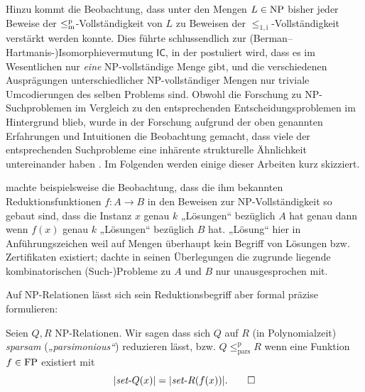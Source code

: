 Hinzu kommt die Beobachtung, dass unter den Mengen $L\in\mathrm{NP}$ bisher jeder Beweise der $\leq_\mathrm{m}^\mathrm{p}$-Vollständigkeit von $L$ zu Beweisen der $\leq_\mathrm{1,i}$-Vollständigkeit verstärkt werden konnte.
Dies führte schlussendlich zur (Berman–Hartmanis-\nolinebreak)\linebreak[1]Isomorphievermutung $\mathsf{IC}$, in der postuliert wird, dass es im Wesentlichen nur \emph{eine} NP-vollständige Menge gibt, und die verschiedenen Ausprägungen unterschiedlicher NP-vollständiger Mengen nur triviale Umcodierungen des selben Problems sind.
Obwohl die Forschung zu NP-Suchproblemen im Vergleich zu den entsprechenden Entscheidungsproblemen im Hintergrund blieb, wurde in der Forschung aufgrund der oben genannten Erfahrungen und Intuitionen die Beobachtung gemacht, dass viele der entsprechenden Suchprobleme eine inhärente strukturelle Ähnlichkeit untereinander haben \parencite[vgl. auch die Diskussion von][]{hemaspaandra_take-home_1998}.
Im Folgenden werden einige dieser Arbeiten kurz skizziert.

\textcite[83]{simon_central_1975} machte beispielsweise die Beobachtung, dass die ihm bekannten Reduktionsfunktionen $f\colon A\to B$ in den Beweisen zur NP-Vollständigkeit so gebaut sind, dass die Instanz $x$ genau $k$ „Lösungen“ bezüglich $A$ hat genau dann wenn $f(x)$ genau $k$ „Lösungen“ bezüglich $B$ hat. „Lösung“ hier in Anführungszeichen weil auf Mengen überhaupt kein Begriff von Lösungen bzw. Zertifikaten existiert; \citeauthor{simon_central_1975} dachte in seinen Überlegungen die zugrunde liegende kombinatorischen (Such-)Probleme zu $A$ und $B$ nur unausgesprochen mit.

Auf NP-Relationen lässt sich sein Reduktionsbegriff aber formal präzise formulieren:
\begin{definition}
    Seien $Q, R$ NP-Relationen. Wir sagen dass sich $Q$ auf $R$ (in Polynomialzeit) \emph{sparsam} (\emph{„parsimonious“}) reduzieren lässt, bzw. $Q\leq_\mathrm{pars}^\mathrm p R$ wenn eine Funktion $f\in\mathrm{FP}$ existiert mit%
    \[ |\mathit{set}\text{-}{}Q(x)|=|\mathit{set}\text{-}{}R(f(x))|. \qedhere \]
\end{definition}

